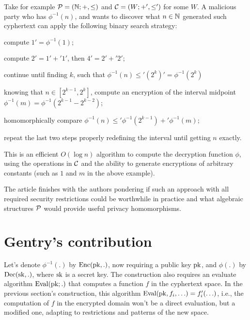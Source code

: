 Take for example $\mathcal P = (\mathbb{N};+,\leq)$ and $\mathcal C = (W;+',\leq')$ for some $W$. A malicious party who has $\phi^{-1}(n)$, and wants to discover what $n\in\mathbb{N}$ generated such cyphertext can apply the following binary search strategy:
\begin{alineas}
\item compute $1'=\phi^{-1}(1)$;
\item compute $2'=1'+'1'$, then $4'=2'+'2'$;
\item continue until finding $k$, such that $\phi^{-1}(n)\leq'(2^k)'=\phi^{-1}(2^k)$
\item knowing that $n\in[2^{k-1},2^{k}]$, compute an encryption of the interval midpoint $\phi^{-1}(m)=\phi^{-1}(2^{k-1}-2^{k-2})$;
\item homomorphically compare $\phi^{-1}(n)\leq'\phi^{-1}(2^{k-1})+'\phi^{-1}(m)$;
\item repeat the last two steps properly redefining the interval until getting $n$ exactly.
\end{alineas}
This is an efficient $O(\log n)$ algorithm to compute the decryption function $\phi$, using the operations in $\mathcal C$ and the ability to generate encryptions of arbitrary constants (such as $1$ and $m$ in the above example).

The article finishes with the authors pondering if such an approach with all required security restrictions could be worthwhile in practice and what algebraic structures $\mathcal P$ would provide useful privacy homomorphisms.

\section{Gentry's contribution}
\label{sec:gentry}
Let's denote $\phi^{-1}(.)$ by $\operatorname{Enc}(\operatorname{pk},.)$, now requiring a public key $\operatorname{pk}$, and $\phi(.)$ by $\operatorname{Dec}(\operatorname{sk},.)$, where $\operatorname{sk}$ is a secret key. The construction also requires an evaluate algorithm $\operatorname{Eval}(\operatorname{pk};.)$ that computes a function $f$ in the cyphertext space. In the previous section's construction, this algorithm $\operatorname{Eval}(\operatorname{pk},f_i,\ldots)=f'_i(\ldots)$, i.e., the computation of $f$ in the encrypted domain won't be a direct evaluation, but a modified one, adapting to restrictions and patterns of the new space.

